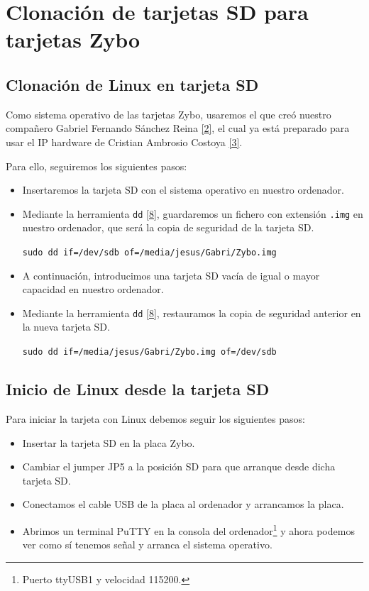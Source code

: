 \section{Clonación de tarjetas SD para tarjetas Zybo}
\hypertarget{InstalacionLinux}{}
\subsection{Clonación de Linux en tarjeta SD}
Como sistema operativo de las tarjetas Zybo, usaremos el que creó nuestro compañero Gabriel Fernando Sánchez Reina \hyperlink{2}{[2]}, el cual ya está preparado para usar el IP hardware de Cristian Ambrosio Costoya \hyperlink{3}{[3]}.

Para ello, seguiremos los siguientes pasos:
\begin{itemize}
	\item Insertaremos la tarjeta SD con el sistema operativo en nuestro ordenador.
	\item Mediante la herramienta \texttt{dd} \hyperlink{8}{[8]}, guardaremos un fichero con extensión \texttt{.img} en nuestro ordenador, que será la copia de seguridad de la tarjeta SD.
	\begin{center}
		\texttt{sudo dd if=/dev/sdb of=/media/jesus/Gabri/Zybo.img}
	\end{center}
	\item A continuación, introducimos una tarjeta SD vacía de igual o mayor capacidad en nuestro ordenador.
	\item Mediante la herramienta \texttt{dd} \hyperlink{8}{[8]}, restauramos la copia de seguridad anterior en la nueva tarjeta SD.
	\begin{center}
		\texttt{sudo dd if=/media/jesus/Gabri/Zybo.img of=/dev/sdb}
	\end{center}
\end{itemize}

\subsection{Inicio de Linux desde la tarjeta SD}
Para iniciar la tarjeta con Linux debemos seguir los siguientes pasos:
\begin{itemize}
	\item Insertar la tarjeta SD en la placa Zybo.
	\item Cambiar el jumper JP5 a la posición SD para que arranque desde dicha tarjeta SD.
	\item Conectamos el cable USB de la placa al ordenador y arrancamos la placa.
	\item Abrimos un terminal PuTTY en la consola del ordenador\footnote{Puerto ttyUSB1 y velocidad 115200.} y ahora podemos ver como sí tenemos señal y arranca el sistema operativo.
\end{itemize}

